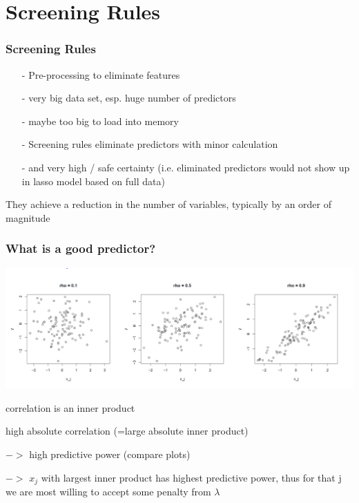 \documentclass{beamer}
\begin{document}


\section{Screening Rules}

\begin{frame}
\frametitle{Screening Rules}

\begin{itemize}
	\item[-] Pre-processing to eliminate features
	\item[-] very big data set, esp. huge number of predictors
	\item[-] maybe too big to load into memory
	\item[-] Screening rules eliminate predictors with minor calculation
	\item[-] and very high / safe certainty (i.e. eliminated predictors would not show up in lasso model based on full data)
\end{itemize}


They achieve a reduction in the number of variables, typically by an order of magnitude




\end{frame}

\begin{frame}
\frametitle{What is a good predictor?}

\includegraphics[width=\linewidth]{img/differentCorrelationPlots}

correlation is an inner product

high absolute correlation (=large absolute inner product) 

$->$ high predictive power (compare plots) 

$->$ $x_j$ with largest inner product has highest predictive power, thus for that j we are most willing to accept some penalty from $\lambda$

\end{frame}
\end{document}
